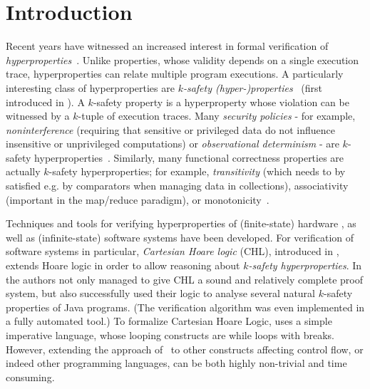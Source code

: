 \section{Introduction}
Recent years have witnessed an increased interest in formal verification of
\emph{hyperproperties}~\cite{ClarksonS08}. Unlike properties, whose validity depends on a single
execution trace, hyperproperties can relate multiple program executions. A
particularly interesting class of hyperproperties are \emph{$k$-safety
  (hyper-)properties}~\cite{FinkbeinerHT19CanonicalKsafety,SousaD16,AgrawalB16RuntimeKSafetyHLTL,ClarksonS08}
(first introduced in \cite{ClarksonS08}).
A $k$-safety property is a hyperproperty whose violation can be witnessed by a
$k$-tuple of execution traces.  Many \emph{security policies} - for example,
\emph{noninterference} (requiring that sensitive or privileged data do not influence
insensitive or unprivileged computations)
or
\emph{observational determinism} 
- are $k$-safety hyperproperties~\cite{ClarksonFKMRS14,ClarksonFKMRS14TR,ClarksonS08}.
Similarly, many functional correctness properties are actually $k$-safety
hyperproperties; for example, \emph{transitivity} (which needs to by satisfied
e.g. by comparators when managing data in collections), associativity
(important in the map/reduce paradigm), or monotonicity~\cite{SousaD16}.


Techniques and tools for verifying hyperproperties of (finite-state) hardware
\cite{CoenenFST19,FinkbeinerRS15}, as well as (infinite-state) software
systems have been developed.  For verification of software systems in
particular, \emph{Cartesian Hoare logic} (CHL), introduced in \cite{SousaD16},
extends Hoare logic in order to allow reasoning about \emph{$k$-safety
  hyperproperties}. In \cite{SousaD16} the authors not only managed to give
CHL a sound and relatively complete proof system, but also successfully used
their logic to analyse several natural $k$-safety properties of Java
programs. (The verification algorithm was even implemented in a fully automated
tool.) To formalize Cartesian Hoare Logic, \cite{SousaD16} uses a simple
imperative language, whose looping constructs are while loops with
breaks. However, extending the approach of~\cite{SousaD16} to
other constructs affecting control flow, or indeed other programming
languages, can be both highly non-trivial and time consuming.


